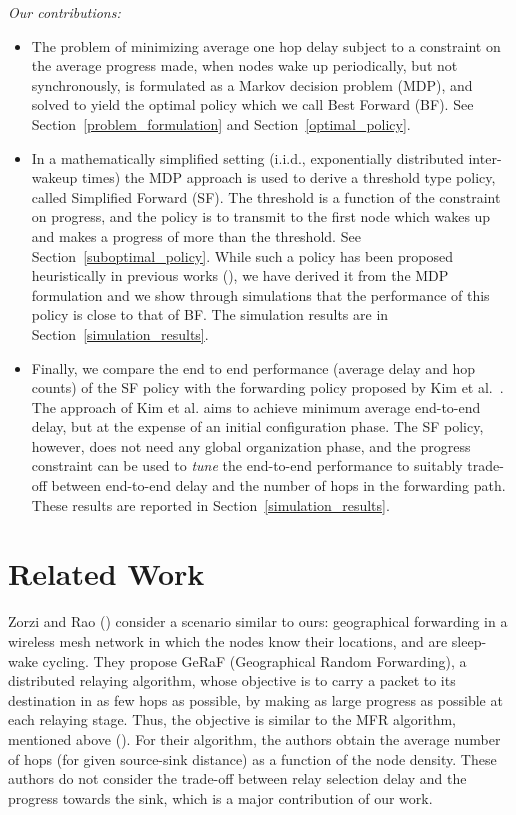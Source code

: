 \documentclass[onecolumn]{IEEEtran}
\begin{document}
\noindent
\emph{Our contributions:} 
\begin{itemize}
\item The problem of minimizing average one hop delay subject to a
  constraint on the average progress made, when nodes wake up
  periodically, but not synchronously, is formulated as a Markov
  decision problem (MDP), and solved to yield the optimal policy which
  we call Best Forward (BF).  See Section~\ref{problem_formulation}
  and Section~\ref{optimal_policy}.
\item In a mathematically simplified setting (i.i.d., exponentially
  distributed inter-wakeup times) the MDP approach is used to derive a
  threshold type policy, called Simplified Forward (SF). The threshold
  is a function of the constraint on progress, and the policy is to
  transmit to the first node which wakes up and makes a progress of
  more than the threshold. See Section~\ref{suboptimal_policy}.  While
  such a policy has been proposed heuristically in previous works (\cite{paruchuri-etal04RAW,liu-etal07CMAC}), we 
  have derived it from the MDP formulation and we
  show through simulations that the performance of this policy is
  close to that of BF.  The simulation results are in
  Section~\ref{simulation_results}.
\item Finally, we compare the end to end performance (average delay
  and hop counts) of the SF policy with the forwarding policy proposed
  by Kim et al.\ \cite{kim-etal09optimal-anycast}. The approach of Kim
  et al.  aims to achieve minimum average end-to-end delay, but at the
  expense of an initial configuration phase. The SF policy, however,
  does not need any global organization phase, and the progress
  constraint  can be used to \emph{tune}
  the end-to-end performance to suitably trade-off between end-to-end
  delay and the number of hops in the forwarding path. These results
  are reported in Section~\ref{simulation_results}.
\end{itemize}


\section{Related Work} 
\label{related_work} 
Zorzi and Rao (\cite{Zorzi-rao03geographicrandom}) consider a scenario
similar to ours: geographical forwarding in a wireless mesh network in
which the nodes know their locations, and are sleep-wake cycling. They
propose GeRaF (Geographical Random Forwarding), a distributed relaying
algorithm, whose objective is to carry a packet to its destination in
as few hops as possible, by making as large progress as possible at
each relaying stage. Thus, the objective is similar to the MFR
algorithm, mentioned above
(\cite{takagi-kleinrock84optimaltransmission,hou-etal86rangecontrol}).  For their algorithm, the authors
obtain the average number of hops (for given source-sink distance) as
a function of the node density. These authors do not consider the trade-off between relay selection
delay and the progress towards the sink, which is a major contribution
of our work.
\end{document}
